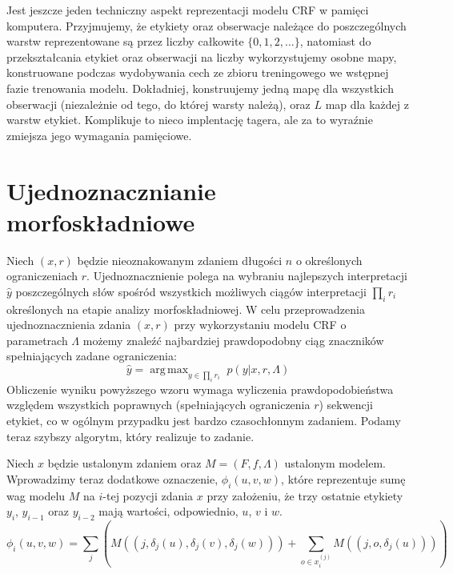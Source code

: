 \documentclass[a4paper,10]{article}
\DeclareMathOperator*{\argmax}{arg\,max}
\begin{document}

Jest jeszcze jeden techniczny aspekt reprezentacji modelu CRF
w pamięci komputera. Przyjmujemy, że etykiety oraz obserwacje
należące do poszczególnych warstw reprezentowane są przez liczby
całkowite $\lbrace 0, 1, 2, \ldots \rbrace$,
natomiast do przekształcania etykiet oraz obserwacji na liczby
wykorzystujemy osobne mapy, konstruowane podczas wydobywania cech
ze zbioru treningowego we wstępnej fazie trenowania modelu.
Dokładniej, konstruujemy jedną mapę dla wszystkich obserwacji
(niezależnie od tego, do której warsty należą), oraz $L$
map dla każdej z warstw etykiet.
Komplikuje to nieco implentację tagera, ale za to
wyraźnie zmiejsza jego wymagania pamięciowe.

\section{Ujednoznacznianie morfoskładniowe}\label{sec:disamb}

Niech $(x, r)$ będzie nieoznakowanym zdaniem długości $n$
o określonych ograniczeniach $r$.
Ujednoznacznienie polega na wybraniu najlepszych interpretacji $\hat y$
poszczególnych słów spośród wszystkich możliwych ciągów
interpretacji $\prod_i r_i$ określonych na etapie analizy morfoskładniowej.
W celu przeprowadzenia ujednoznacznienia zdania $(x, r)$ przy
wykorzystaniu modelu CRF o parametrach $\Lambda$ możemy znaleźć
najbardziej prawdopodobny ciąg znaczników spełniających zadane
ograniczenia:
\begin{equation}\label{eq:argmax_p}
\hat y = \argmax_{y \in \prod_i r_i} \; p(y \vert x, r, \Lambda)
\end{equation}
Obliczenie wyniku powyższego wzoru wymaga wyliczenia prawdopodobieństwa
względem wszystkich poprawnych (spełniających ograniczenia $r$) sekwencji
etykiet, co w ogólnym przypadku jest bardzo czasochłonnym zadaniem.
Podamy teraz szybszy algorytm, który realizuje to zadanie.

Niech $x$ będzie ustalonym zdaniem oraz $M = (F, f, \Lambda)$
ustalonym modelem. Wprowadzimy teraz dodatkowe oznaczenie,
$\phi_i(u, v, w)$, które reprezentuje
sumę wag modelu $M$ na $i$-tej pozycji zdania $x$ przy założeniu,
że trzy ostatnie etykiety $y_i$, $y_{i-1}$ oraz $y_{i-2}$ mają wartości,
odpowiednio, $u$, $v$ i $w$.
\begin{equation}\label{eq:phi}
\phi_i(u, v, w) = \sum_j \left( M((j, \delta_j(u), \delta_j(v), \delta_j(w)))
  + \sum_{o \in x^{(j)}_i} M((j, o, \delta_j(u))) \right)
\end{equation}
\end{document}
